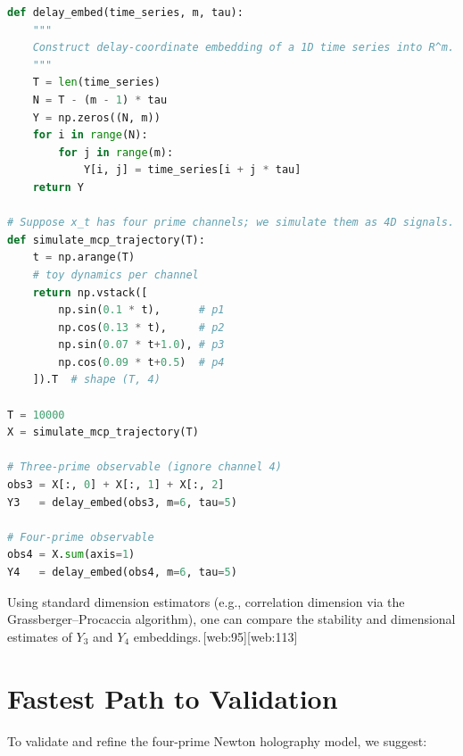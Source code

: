 \documentclass[11pt]{article}
\begin{document}
\begin{lstlisting}[language=Python,caption={Delay embeddings with three vs.\ four observables}]
def delay_embed(time_series, m, tau):
    """
    Construct delay-coordinate embedding of a 1D time series into R^m.
    """
    T = len(time_series)
    N = T - (m - 1) * tau
    Y = np.zeros((N, m))
    for i in range(N):
        for j in range(m):
            Y[i, j] = time_series[i + j * tau]
    return Y

# Suppose x_t has four prime channels; we simulate them as 4D signals.
def simulate_mcp_trajectory(T):
    t = np.arange(T)
    # toy dynamics per channel
    return np.vstack([
        np.sin(0.1 * t),      # p1
        np.cos(0.13 * t),     # p2
        np.sin(0.07 * t+1.0), # p3
        np.cos(0.09 * t+0.5)  # p4
    ]).T  # shape (T, 4)

T = 10000
X = simulate_mcp_trajectory(T)

# Three-prime observable (ignore channel 4)
obs3 = X[:, 0] + X[:, 1] + X[:, 2]
Y3   = delay_embed(obs3, m=6, tau=5)

# Four-prime observable
obs4 = X.sum(axis=1)
Y4   = delay_embed(obs4, m=6, tau=5)
\end{lstlisting}

Using standard dimension estimators (e.g., correlation dimension via
the Grassberger--Procaccia algorithm), one can compare the stability and
dimensional estimates of $Y_3$ and $Y_4$ embeddings.\,[web:95][web:113]

\section{Fastest Path to Validation}

To validate and refine the four-prime Newton holography model, we suggest:
\end{document}
